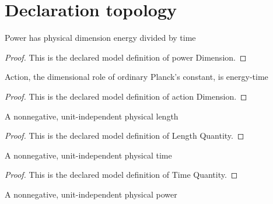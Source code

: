 \section{Declaration topology}
\begin{definition}
  \label{def:physics:phyx-mini-0588:phyxminiproblems-problemphyxmini0588-powerdimension}
  Power has physical dimension energy divided by time
\end{definition}
\begin{proof}
  This is the declared model definition of power Dimension.
\end{proof}
\begin{definition}
  \label{def:physics:phyx-mini-0588:phyxminiproblems-problemphyxmini0588-actiondimension}
  Action, the dimensional role of ordinary Planck's constant, is energy-time
\end{definition}
\begin{proof}
  This is the declared model definition of action Dimension.
\end{proof}
\begin{definition}
  \label{def:physics:phyx-mini-0588:phyxminiproblems-problemphyxmini0588-lengthquantity}
  A nonnegative, unit-independent physical length
\end{definition}
\begin{proof}
  This is the declared model definition of Length Quantity.
\end{proof}
\begin{definition}
  \label{def:physics:phyx-mini-0588:phyxminiproblems-problemphyxmini0588-timequantity}
  A nonnegative, unit-independent physical time
\end{definition}
\begin{proof}
  This is the declared model definition of Time Quantity.
\end{proof}
\begin{definition}
  \label{def:physics:phyx-mini-0588:phyxminiproblems-problemphyxmini0588-powerquantity}
  A nonnegative, unit-independent physical power
\end{definition}
